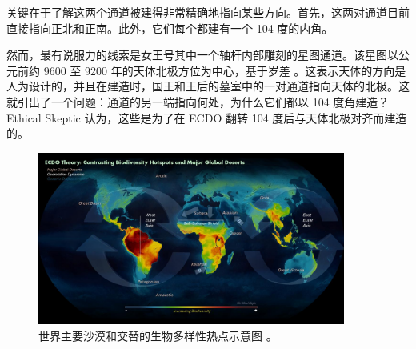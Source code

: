 \documentclass[10pt,twocolumn,letterpaper]{article}
\begin{document}
关键在于了解这两个通道被建得非常精确地指向某些方向。首先，这两对通道目前直接指向正北和正南。此外，它们每个都建有一个 104 度的内角。

然而，最有说服力的线索是女王号其中一个轴杆内部雕刻的星图通道。该星图以公元前约 9600 至 9200 年的天体北极方位为中心，基于岁差 \cite{28}。这表示天体的方向是人为设计的，并且在建造时，国王和王后的墓室中的一对通道指向天体的北极。这就引出了一个问题：通道的另一端指向何处，为什么它们都以 104 度角建造？Ethical Skeptic 认为，这些是为了在 ECDO 翻转 104 度后与天体北极对齐而建造的。

\begin{figure}[t]
\begin{center}
\includegraphics[width=0.9\textwidth]{biodiversity.jpg}
\end{center}
   \caption{世界主要沙漠和交替的生物多样性热点示意图 \cite{28}。}
\label{fig:9}
\end{figure}
\end{document}
